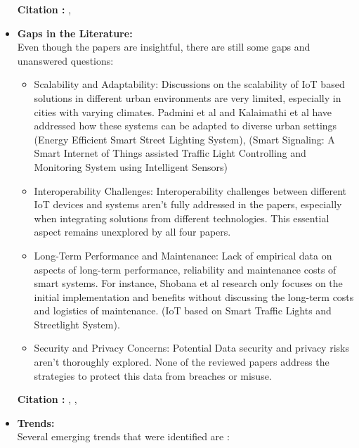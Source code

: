 \documentclass[12pt,a4paper]{article}
\begin{document}
\begin{itemize}
    \textbf{Citation : }  \cite{10060318}, \cite{10568678}
    
    \item \textbf{Gaps in the Literature:}\\
    
    Even though the papers are insightful, there are still some gaps and unanswered questions: 
    
    \begin{itemize}
        \item Scalability and Adaptability: Discussions on the scalability of IoT based solutions in different urban environments are very limited, especially in cities with varying climates. Padmini et al and Kalaimathi et al have addressed how these systems can be adapted to diverse urban settings (Energy Efficient Smart Street Lighting System), (Smart Signaling: A Smart Internet of Things assisted Traffic Light Controlling and Monitoring System using Intelligent Sensors)
        \item Interoperability Challenges: Interoperability challenges between different IoT devices and systems aren't fully addressed in the papers, especially when integrating solutions from different technologies. This essential aspect remains unexplored by all four papers. 
        \item Long-Term Performance and Maintenance: Lack of empirical data on aspects of long-term performance, reliability and maintenance costs of smart systems. For instance, Shobana et al research only focuses on the initial implementation and benefits without discussing the long-term costs and logistics of maintenance. (IoT based on Smart Traffic Lights and Streetlight System).  
        \item Security and Privacy Concerns: Potential Data security and privacy risks aren't thoroughly explored. None of the reviewed papers address the strategies to protect this data from breaches or misuse. 
    \end{itemize}

    \textbf{Citation : } \cite{10060318}, \cite{10568678}, 
    
    \item \textbf{Trends:}\\
    
    Several emerging trends that were identified are :
    

\end{itemize}
\end{document}
